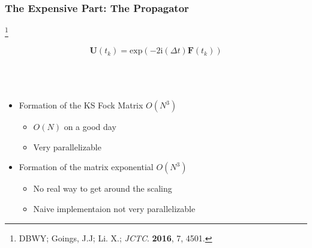 \documentclass{beamer}
\newcommand{\bpar}[1]{\left( #1 \right)}                  %
\renewcommand{\exp}[1]{\mathrm{exp}\bpar{#1}}
\newcommand\blfootnote[1]{%
  \begingroup
  \renewcommand\thefootnote{}\footnote{#1}%
  \addtocounter{footnote}{-1}%
  \endgroup
}
\begin{document}
\begin{frame}
\frametitle{The Expensive Part: The Propagator}
\blfootnote{DBWY; Goings, J.J; Li. X.; \emph{JCTC}. \textbf{2016}, 7, 4501.}
{ \LARGE
\begin{equation*}
\mathbf{U}(t_k) = \exp{-2\mathrm{i}(\Delta t) \mathbf{F}(t_k)}
\end{equation*}
}
~\\
~\\
~\\


\begin{itemize}
  \item Formation of the KS Fock Matrix $O(N^3)$
  \begin{itemize}
    \normalsize
    \item $O(N)$ on a good day
    \item Very parallelizable
  \end{itemize}
  \item Formation of the matrix exponential $O(N^3)$
  \begin{itemize}
    \normalsize
    \item No real way to get around the scaling
    \item Naive implementaion not very parallelizable
  \end{itemize}
\end{itemize}

\end{frame}
\end{document}
